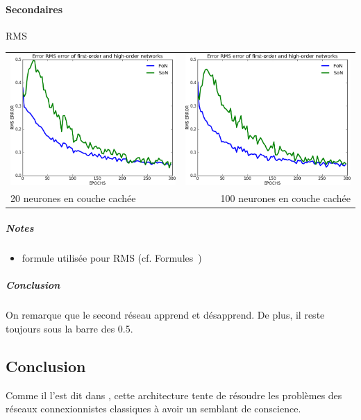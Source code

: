     \paragraph{Secondaires}
      RMS
      \begin{center}
	\begin{tabular}{lr}
	  \hspace*{-1cm}
	  \includegraphics[width=250px]{data/expC2/rms_20.png}
	  &
	  \includegraphics[width=250px]{data/expC2/rms_100.png} \\
	  
	  20 neurones en couche cachée
	  &
	  \hspace*{-1cm}
	  100 neurones en couche cachée
	\end{tabular}
      \end{center} 
      \subparagraph{Notes}
	\begin{itemize}
	  \item formule utilisée pour RMS (cf. Formules~)
	\end{itemize}
      \subparagraph{Conclusion}
	On remarque que le second réseau apprend et désapprend. De plus, il reste toujours sous la barre
	des 0.5.


  \subsection{Conclusion}
      Comme il l'est dit dans \cite{Cleeremans_2007}, cette architecture tente de résoudre les problèmes des réseaux connexionnistes
    classiques à avoir un semblant de conscience.
    
